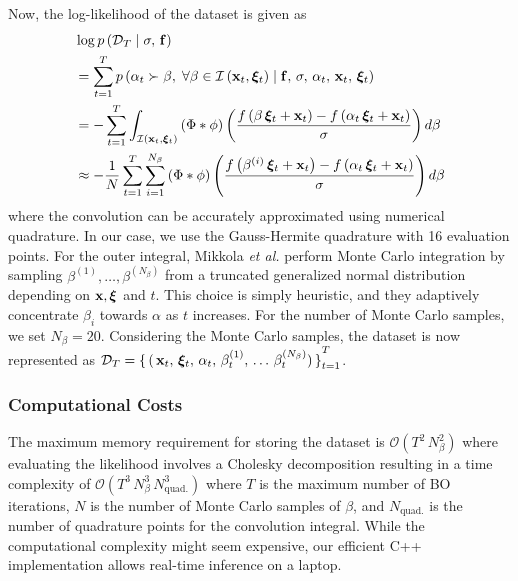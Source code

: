 Now, the log-likelihood of the dataset is given as
{\small
\begin{align}
  &\log p\left(\mathcal{D}_T \mid \sigma,\, \mathbf{f} \right) \nonumber \\
  &= \sum_{t=1}^{T} p\left(\alpha_t \succ \beta,\; \forall \beta \in \mathcal{I}\left(\mathbf{x}_t, \bm{\xi}_t\right) \mid \mathbf{f},\, \sigma,\, \alpha_t,\, \mathbf{x}_t,\, \bm{\xi}_t\right) \\
  &= -\sum_{t=1}^{T} \int_{\mathcal{I}\left(\mathbf{x}_{t}, \bm{\xi}_{t}\right)} \left(\Phi * \phi \right) \left( \frac{ f\left(\beta \, \bm{\xi}_{t} + \mathbf{x}_{t} \right) - f\left(\alpha_{t} \, \bm{\xi}_{t} + \mathbf{x}_{t} \right) }{\sigma} \right) d\beta \\
  &\approx -\frac{1}{N}  \sum_{t=1}^{T} \sum_{i=1}^{N_{\beta}} \left(\Phi * \phi \right) \left( \frac{ f\left(\beta^{(i)} \, \bm{\xi}_{t} + \mathbf{x}_{t} \right) - f\left(\alpha_{t} \, \bm{\xi}_{t} + \mathbf{x}_{t} \right) }{\sigma} \right) d\beta
\end{align}
}%
{\noindent}where the convolution can be accurately approximated using numerical quadrature.
In our case, we use the Gauss-Hermite quadrature with 16 evaluation points.
For the outer integral, Mikkola \textit{et al.} perform Monte Carlo integration by sampling \(\beta^{(1)}, \ldots, \beta^{(N_{\beta})} \) from a truncated generalized normal distribution depending on \(\mathbf{x}, \bm{\xi}\) and \(t\).
This choice is simply heuristic, and they adaptively concentrate \(\beta_i\) towards \(\alpha\) as \(t\) increases.
For the number of Monte Carlo samples, we set \(N_{\beta}=20\).
Considering the Monte Carlo samples, the dataset is now represented as \(\mathcal{D}_{T} = {\{\,(\,\mathbf{x}_{t},\, \bm{\xi}_{t},\, \alpha_{t},\, \beta^{(1)}_{t},\, \ldots\, \beta^{(N_{\beta})}_{t})\,\}}_{t=1}^{T}\).

\subsubsection{Computational Costs}
The maximum memory requirement for storing the dataset is \(\mathcal{O}\left( T^2 \, N_{\beta}^2  \right)\) where evaluating the likelihood involves a Cholesky decomposition resulting in a time complexity of \(\mathcal{O}\left( T^3 \, N_{\beta}^3 \, N_{\text{quad.}}^3  \right)\) where \(T\) is the maximum number of BO iterations, \(N\) is the number of Monte Carlo samples of \(\beta\), and \(N_{\text{quad.}}\) is the number of quadrature points for the convolution integral.
While the computational complexity might seem expensive, our efficient C++ implementation allows real-time inference on a laptop.

